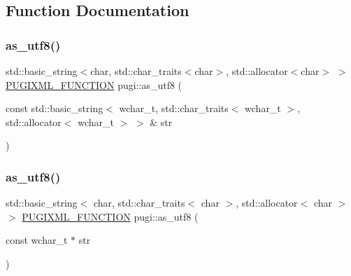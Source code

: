 \subsection{Function Documentation}
\mbox{\label{namespacepugi_a4167cd183b5a524d0310df50caa44a80}} 
\subsubsection{\texorpdfstring{as\+\_\+utf8()}{as\_utf8()}\hspace{0.1cm}{\footnotesize\ttfamily [1/3]}}
{\footnotesize\ttfamily std\+::basic\+\_\+string$<$char, std\+::char\+\_\+traits$<$char$>$, std\+::allocator$<$char$>$ $>$ \hyperlink{pugixml_8hpp_a3d91f8ab11645e6dac8783d86d152b31}{P\+U\+G\+I\+X\+M\+L\+\_\+\+F\+U\+N\+C\+T\+I\+ON} pugi\+::as\+\_\+utf8 (\begin{DoxyParamCaption}\item[{const std\+::basic\+\_\+string$<$ wchar\+\_\+t, std\+::char\+\_\+traits$<$ wchar\+\_\+t $>$, std\+::allocator$<$ wchar\+\_\+t $>$ $>$ \&}]{str }\end{DoxyParamCaption})}

\mbox{\label{namespacepugi_a69383a1ee3e92185f93bb2322472d3ce}} 
\subsubsection{\texorpdfstring{as\+\_\+utf8()}{as\_utf8()}\hspace{0.1cm}{\footnotesize\ttfamily [2/3]}}
{\footnotesize\ttfamily std\+::basic\+\_\+string$<$ char, std\+::char\+\_\+traits$<$ char $>$, std\+::allocator$<$ char $>$ $>$ \hyperlink{pugixml_8hpp_a3d91f8ab11645e6dac8783d86d152b31}{P\+U\+G\+I\+X\+M\+L\+\_\+\+F\+U\+N\+C\+T\+I\+ON} pugi\+::as\+\_\+utf8 (\begin{DoxyParamCaption}\item[{const wchar\+\_\+t $\ast$}]{str }\end{DoxyParamCaption})}

\mbox{\label{namespacepugi_ab4be9ab3dc86b13599b9f2fd2f778dfb}} 
